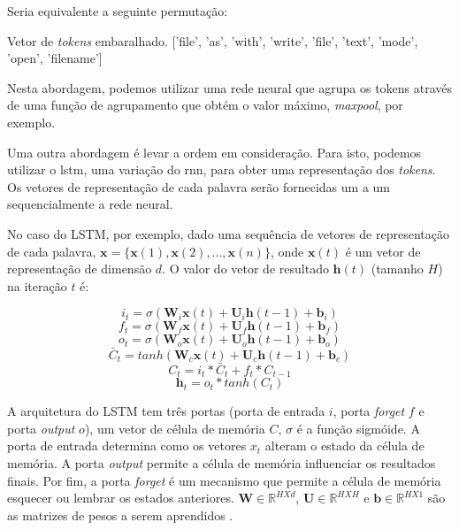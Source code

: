 Seria equivalente a seguinte permutação:

\begin{mypythonembedding}{Vetor de \textit{tokens} embaralhado.}
['file', 'as', 'with', 'write', 'file', 'text', 'mode', 'open', 'filename']
\end{mypythonembedding}

Nesta abordagem, podemos utilizar uma rede neural que agrupa os tokens através de uma função de agrupamento que obtém o valor máximo, \textit{maxpool}, por exemplo.

Uma outra abordagem é levar a ordem em consideração. Para isto, podemos utilizar o \acrfull{lstm}, uma variação do \acrfull{rnn}, para obter uma representação dos \textit{tokens}. Os vetores de representação de cada palavra serão fornecidas um a um sequencialmente a rede neural. 



No caso do LSTM, por exemplo, dado uma sequência de vetores de representação de cada palavra, $\bm{x} = \{ \bm{x}(1), \bm{x}(2), . . ., \bm{x}(n) \}$, onde $\bm{x}(t)$ é um vetor de representação de dimensão $d$. O valor do vetor de resultado $\bm{h}(t)$ (tamanho $H$) na iteração $t$ é:

\begin{equation}
    i_{t} = \sigma(\bm{W}_{i}\bm{x}(t) + \bm{U}_{i}\bm{h}(t - 1) + \bm{b}_{i})
\end{equation}
\begin{equation}
    f_{t} = \sigma(\bm{W}_{f}\bm{x}(t) + \bm{U}_{f}\bm{h}(t - 1) + \bm{b}_{f})
\end{equation}
\begin{equation}
    o_{t} = \sigma(\bm{W}_{o}\bm{x}(t) + \bm{U}_{o}\bm{h}(t - 1) + \bm{b}_{o})
\end{equation}
\begin{equation}
    \bar{C}_{t} = tanh(\bm{W}_{c}\bm{x}(t) + \bm{U}_{c}\bm{h}(t - 1) + \bm{b}_{c})
\end{equation}
\begin{equation}
    C_{t} = i_{t} * \bar{C}_t + f_{t} * C_{t - 1}
\end{equation}
\begin{equation}
    \bm{h}_{t} = o_{t} * tanh(C_{t})
\end{equation}

A arquitetura do LSTM tem três portas (porta de entrada $i$, porta \textit{forget} $f$ e porta \textit{output} $o$), um vetor de célula de memória $C$, $\sigma$ é a função sigmóide. A porta de entrada determina como os vetores $x_{t}$ alteram o estado da célula de memória. A porta \textit{output} permite a célula de memória influenciar os resultados finais. Por fim, a porta \textit{forget} é um mecanismo que permite a célula de memória esquecer ou lembrar os estados anteriores. $\bm{W} \in \mathbb{R}^{H X d}$, $\bm{U} \in \mathbb{R}^{H X H}$ e $\bm{b} \in \mathbb{R}^{H X 1}$ são as matrizes de pesos a serem aprendidos \citep{tan-lstm-qa}.

